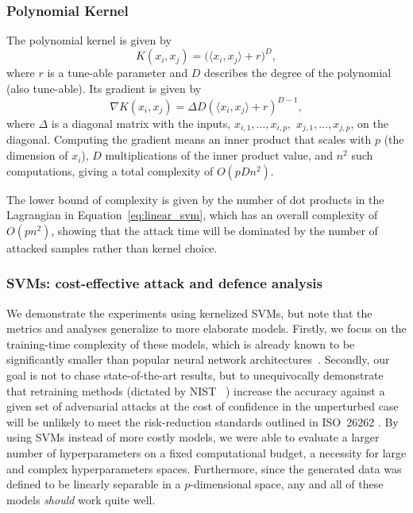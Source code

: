 \documentclass[fonts]{icst}
\begin{document}
\subsubsection{Polynomial Kernel}

The polynomial kernel is given by
$$
    K(x_i, x_j) = \big(\langle x_i, x_j \rangle + r \big)^D,
$$
where $r$ is a tune-able parameter and $D$ describes the degree of the polynomial (also tune-able). Its gradient is given by
$$
    \nabla K(x_i, x_j) = \Delta D(\langle x_i, x_j \rangle + r)^{D-1},
$$
where $\Delta$ is a diagonal matrix with the inputs, $x_{i,1},\ldots,x_{i,p},$ $x_{j,1},\ldots,x_{j,p}$, on the diagonal. Computing the gradient means an inner product that scales with $p$ (the dimension of $x_i$), $D$ multiplications of the inner product value, and $n^2$ such computations, giving a total complexity of $O(pDn^2)$.

The lower bound of complexity is given by the number of dot products in the Lagrangian in Equation~\ref{eq:linear_svm}, which has an overall complexity of $O(pn^2)$, showing that the attack time will be dominated by the number of attacked samples rather than kernel choice.


\subsubsection{SVMs: cost-effective attack and defence analysis}
\label{model}

We demonstrate the experiments using kernelized SVMs, but note that the metrics and analyses generalize to more elaborate models. Firstly, we focus on the training-time complexity of these models, which is already known to be significantly smaller than popular neural network architectures~\cite{bienstock2018principled}. Secondly, our goal is not to chase state-of-the-art results, but to unequivocally demonstrate that retraining methods (dictated by NIST ~\cite{falco2006using}) increase the accuracy against a given set of adversarial attacks at the cost of confidence in the unperturbed case will be unlikely to meet the risk-reduction standards outlined in ISO~26262 \cite{iso26262}.
By using SVMs instead of more costly models, we were able to evaluate a larger number of hyperparameters on a fixed computational budget, a necessity for large and complex hyperparameters spaces. Furthermore, since the generated data was defined to be linearly separable in a $p$-dimensional space, any and all of these models \textit{should} work quite well. 
\end{document}
